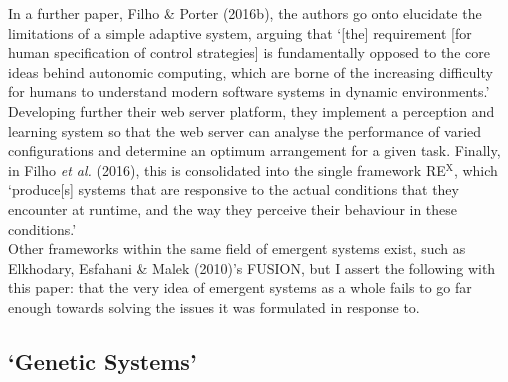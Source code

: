 \documentclass[compsoc,12pt,a4paper]{IEEEtran}
\begin{document}
			In a further paper, Filho \& Porter (2016b), the authors go onto elucidate the limitations of a simple adaptive system, arguing that `[the] requirement [for human specification of control strategies] is fundamentally opposed to  the  core  ideas  behind  autonomic  computing,  which  are borne of the increasing difficulty for humans to understand modern software systems in dynamic environments.'\cite{losingcontrol} Developing further their web server platform, they implement a perception and learning system so that the web server can analyse the performance of varied configurations and determine an optimum arrangement for a given task. Finally, in Filho \textit{et al.} (2016), this is consolidated into the single framework RE$^{\text{X}}$, which `produce[s] systems that are responsive to the actual conditions that they encounter at runtime, and the way they perceive their behaviour in these conditions.'\cite{rex}\\
		Other frameworks within the same field of emergent systems exist, such as Elkhodary, Esfahani \& Malek (2010)'s FUSION,\cite{fusion} but I assert the following with this paper: that the very idea of emergent systems as a whole fails to go far enough towards solving the issues it was formulated in response to.
		
		\subsection{`Genetic Systems'}
		
\end{document}
